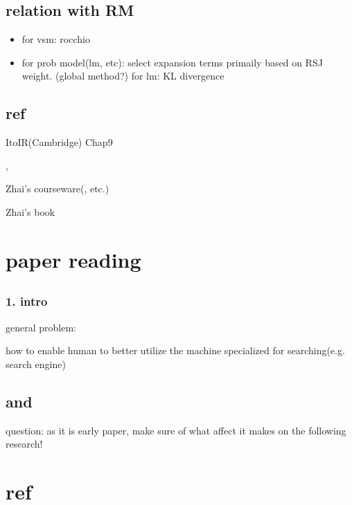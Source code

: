 \documentclass[•]{article}
\begin{document}
\subsection{relation with RM}
\cite{Lv2011}
\begin{itemize}
\item for vsm:
rocchio
\item for prob model(lm, etc): select expansion terms primaily based on RSJ weight. (global method?)
\subitem for lm: KL divergence
\end{itemize}
\subsection{ref}
ItoIR(Cambridge) Chap9

\cite{Lv2011}, \cite{Zhai2001}

Zhai's courseware(\cite{CS598CXZreadings}, etc.)

Zhai's book

\section{paper reading}
\subsection{\cite{White2007}}
\subsubsection{1. intro}
general problem:

how to enable human to better utilize the machine specialized for searching(e.g. search engine)

\subsection{\cite{Zhai2001}}

\subsection{\cite{Ponte1998} and \cite{Ponte1998a}}
question: as it is early paper, make sure of what affect it makes on the following research!

\section{ref}




\end{document}
